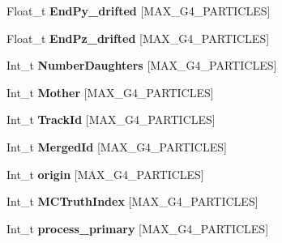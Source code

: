 \begin{DoxyCompactItemize}
\item 
\hypertarget{classanatree_abda9c0eb8994f873be468bf6511172f2}{Float\-\_\-t {\bfseries End\-Py\-\_\-drifted} \mbox{[}M\-A\-X\-\_\-\-G4\-\_\-\-P\-A\-R\-T\-I\-C\-L\-E\-S\mbox{]}}\label{classanatree_abda9c0eb8994f873be468bf6511172f2}

\item 
\hypertarget{classanatree_afcb865308ae3b6a8f831343c4578b784}{Float\-\_\-t {\bfseries End\-Pz\-\_\-drifted} \mbox{[}M\-A\-X\-\_\-\-G4\-\_\-\-P\-A\-R\-T\-I\-C\-L\-E\-S\mbox{]}}\label{classanatree_afcb865308ae3b6a8f831343c4578b784}

\item 
\hypertarget{classanatree_a4050a454626a657acbc04c35963260f1}{Int\-\_\-t {\bfseries Number\-Daughters} \mbox{[}M\-A\-X\-\_\-\-G4\-\_\-\-P\-A\-R\-T\-I\-C\-L\-E\-S\mbox{]}}\label{classanatree_a4050a454626a657acbc04c35963260f1}

\item 
\hypertarget{classanatree_a54b7b08ef69d97e58476661f41e1c157}{Int\-\_\-t {\bfseries Mother} \mbox{[}M\-A\-X\-\_\-\-G4\-\_\-\-P\-A\-R\-T\-I\-C\-L\-E\-S\mbox{]}}\label{classanatree_a54b7b08ef69d97e58476661f41e1c157}

\item 
\hypertarget{classanatree_a01c9a26606481a2f8463e30b238c0181}{Int\-\_\-t {\bfseries Track\-Id} \mbox{[}M\-A\-X\-\_\-\-G4\-\_\-\-P\-A\-R\-T\-I\-C\-L\-E\-S\mbox{]}}\label{classanatree_a01c9a26606481a2f8463e30b238c0181}

\item 
\hypertarget{classanatree_a35ce564593e3fd4b91ce55d0277cc141}{Int\-\_\-t {\bfseries Merged\-Id} \mbox{[}M\-A\-X\-\_\-\-G4\-\_\-\-P\-A\-R\-T\-I\-C\-L\-E\-S\mbox{]}}\label{classanatree_a35ce564593e3fd4b91ce55d0277cc141}

\item 
\hypertarget{classanatree_a459ef75bdfe9607b73e38318c36fdf50}{Int\-\_\-t {\bfseries origin} \mbox{[}M\-A\-X\-\_\-\-G4\-\_\-\-P\-A\-R\-T\-I\-C\-L\-E\-S\mbox{]}}\label{classanatree_a459ef75bdfe9607b73e38318c36fdf50}

\item 
\hypertarget{classanatree_a894f10e8e21f088ef42d5f2688eb2430}{Int\-\_\-t {\bfseries M\-C\-Truth\-Index} \mbox{[}M\-A\-X\-\_\-\-G4\-\_\-\-P\-A\-R\-T\-I\-C\-L\-E\-S\mbox{]}}\label{classanatree_a894f10e8e21f088ef42d5f2688eb2430}

\item 
\hypertarget{classanatree_a104d39060f7947f9e5c2ee46e33ef686}{Int\-\_\-t {\bfseries process\-\_\-primary} \mbox{[}M\-A\-X\-\_\-\-G4\-\_\-\-P\-A\-R\-T\-I\-C\-L\-E\-S\mbox{]}}\label{classanatree_a104d39060f7947f9e5c2ee46e33ef686}


\end{DoxyCompactItemize}
